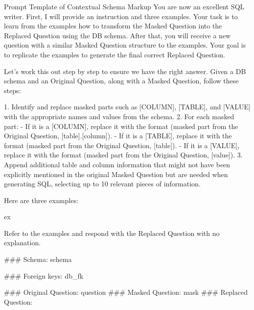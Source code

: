 \begin{myverbatim}{Prompt Template of Contextual Schema Markup}
You are now an excellent SQL writer. First, I will provide an instruction and three examples. Your task is to learn from the examples how to transform the Masked Question into the Replaced Question using the DB schema. After that, you will receive a new question with a similar Masked Question structure to the examples. Your goal is to replicate the examples to generate the final correct Replaced Question.

Let's work this out step by step to ensure we have the right answer. Given a DB schema and an Original Question, along with a Masked Question, follow these steps:

1. Identify and replace masked parts such as [COLUMN], [TABLE], and [VALUE] with the appropriate names and values from the schema.
2. For each masked part:
    - If it is a [COLUMN], replace it with the format (masked part from the Original Question, [table].[column]).
    - If it is a [TABLE], replace it with the format (masked part from the Original Question, [table]).
    - If it is a [VALUE], replace it with the format (masked part from the Original Question, [value]).
3. Append additional table and column information that might not have been explicitly mentioned in the original Masked Question but are needed when generating SQL, selecting up to 10 relevant pieces of information.

Here are three examples:

{ex}

Refer to the examples and respond with the Replaced Question with no explanation.

### Schema:
{schema}

### Foreign keys:
{db_fk}

### Original Question: {question}
### Masked Question: {mask}
### Replaced Question:
\end{myverbatim}


